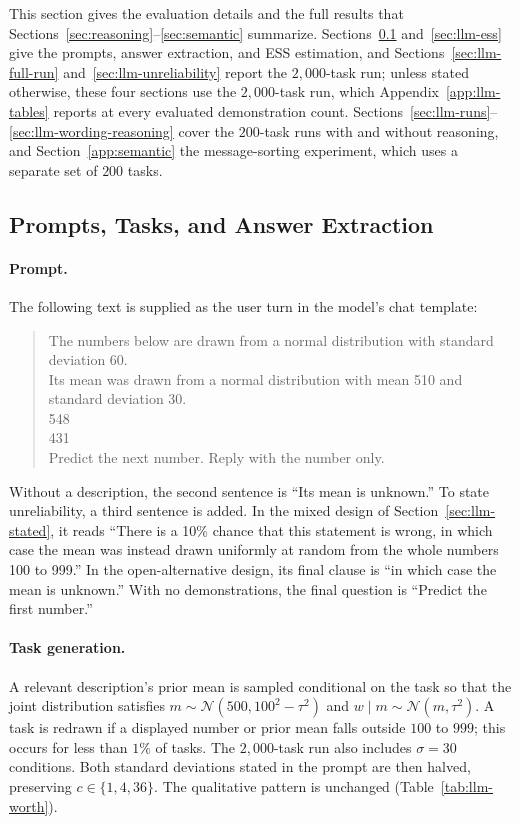 This section gives the evaluation details and the full results that Sections~\ref{sec:reasoning}--\ref{sec:semantic} summarize. Sections~\ref{sec:llm-prompts} and~\ref{sec:llm-ess} give the prompts, answer extraction, and ESS estimation, and Sections~\ref{sec:llm-full-run} and~\ref{sec:llm-unreliability} report the $2{,}000$-task run; unless stated otherwise, these four sections use the $2{,}000$-task run, which Appendix~\ref{app:llm-tables} reports at every evaluated demonstration count. Sections~\ref{sec:llm-runs}--\ref{sec:llm-wording-reasoning} cover the $200$-task runs with and without reasoning, and Section~\ref{app:semantic} the message-sorting experiment, which uses a separate set of $200$ tasks.

\subsection{Prompts, Tasks, and Answer Extraction}\label{sec:llm-prompts}

\paragraph{Prompt.}
The following text is supplied as the user turn in the model's chat template:
\begin{quote}\scriptsize\ttfamily\raggedright
The numbers below are drawn from a normal distribution with standard deviation 60.\\
Its mean was drawn from a normal distribution with mean 510 and standard deviation 30.\\[3pt]
548\\
431\\[3pt]
Predict the next number. Reply with the number only.
\end{quote}

Without a description, the second sentence is ``Its mean is unknown.'' To state unreliability, a third sentence is added. In the mixed design of Section~\ref{sec:llm-stated}, it reads ``There is a 10\% chance that this statement is wrong, in which case the mean was instead drawn uniformly at random from the whole numbers 100 to 999.'' In the open-alternative design, its final clause is ``in which case the mean is unknown.'' With no demonstrations, the final question is ``Predict the first number.''

\paragraph{Task generation.}
A relevant description's prior mean is sampled conditional on the task so that the joint distribution satisfies $m \sim \mathcal{N}(500,100^2-\tau^2)$ and $w\mid m \sim \mathcal{N}(m,\tau^2)$. A task is redrawn if a displayed number or prior mean falls outside $100$ to $999$; this occurs for less than $1\%$ of tasks. The $2{,}000$-task run also includes $\sigma = 30$ conditions. Both standard deviations stated in the prompt are then halved, preserving $c \in \{1,4,36\}$. The qualitative pattern is unchanged (Table~\ref{tab:llm-worth}).

